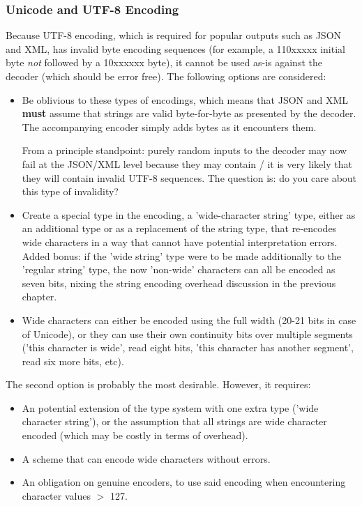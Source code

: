 \subsubsection{Unicode and UTF-8 Encoding}

Because UTF-8 encoding, which is required for popular outputs such as
JSON and XML, has invalid byte encoding sequences
(for example, a 110xxxxx initial byte \textit{not} followed by a
10xxxxxx byte), it cannot be used as-is against the decoder (which
should be error free). The following options are considered:

\begin{itemize}
\item Be oblivious to these types of encodings, which means that JSON and XML
      \textbf{must} assume that strings are valid byte-for-byte
      as presented by the decoder. The accompanying encoder simply
      adds bytes as it encounters them.

      From a principle standpoint: purely random inputs to the
      decoder may now fail at the JSON/XML level because they may
      contain / it is very likely that they will contain invalid
      UTF-8 sequences. The question is: do you care about this type
      of invalidity?
\item Create a special type in the encoding, a 'wide-character string' type,
      either as an additional type or as a replacement of the string type,
      that re-encodes wide characters in a way that cannot have
      potential interpretation errors. Added bonus: if the 'wide string' type
      were to be made additionally to the 'regular string' type, the now
      'non-wide' characters can all be encoded as seven bits, nixing the
      string encoding overhead discussion in the previous chapter.
\item Wide characters can either be encoded using the full width (20-21 bits
      in case of Unicode), or they can use their own continuity bits over
      multiple segments ('this character is wide', read eight bits,
      'this character has another segment', read six more bits, etc).
\end{itemize}

The second option is probably the most desirable. However, it requires:

\begin{itemize}
\item An potential extension of the type system with one extra type
      ('wide character string'), or the assumption that all strings are
      wide character encoded (which may be costly in terms of overhead).
\item A scheme that can encode wide characters without errors.
\item An obligation on genuine encoders, to use said encoding when
      encountering character values $>$ 127.
\end{itemize}

